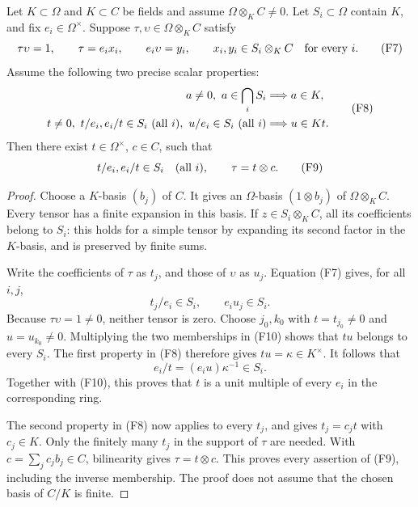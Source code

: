 \begin{srlemma}
\label{lem:faithful-flat-tensor-descent}
Let \(K\subset\Omega\) and \(K\subset C\) be fields and assume
\(\Omega\otimes_K C\ne0\).  Let \(S_i\subset\Omega\) contain \(K\),
and fix \(e_i\in\Omega^\times\).  Suppose
\(\tau,\upsilon\in\Omega\otimes_K C\) satisfy
\[
 \tau\upsilon=1,\qquad
 \tau=e_i x_i,\qquad e_i\upsilon=y_i,\qquad
 x_i,y_i\in S_i\otimes_K C \quad\hbox{for every }i.
 \tag{F7}\label{eq:faithful-descent-local-tensors}
\]
Assume the following two precise scalar properties:
\[
 \begin{split}
 a\ne0,\ a\in\bigcap_iS_i
     &\Longrightarrow a\in K,\\
 t\ne0,\ t/e_i,e_i/t\in S_i\ (\hbox{all }i),\
                 u/e_i\in S_i\ (\hbox{all }i)
     &\Longrightarrow u\in Kt .
 \end{split}                                      \tag{F8}
 \label{eq:faithful-descent-scalar-properties}
\]
Then there exist \(t\in\Omega^\times\), \(c\in C\), such that
\[
            t/e_i,e_i/t\in S_i\quad(\hbox{all }i),
                   \qquad \tau=t\otimes c.
 \tag{F9}\label{eq:faithful-descent-result}
\]
\end{srlemma}
\begin{proof}
Choose a \(K\)-basis \((b_j)\) of \(C\).
It gives an \(\Omega\)-basis \((1\otimes b_j)\) of
\(\Omega\otimes_K C\).  Every tensor has a finite expansion in
this basis.  If \(z\in S_i\otimes_K C\), all its coefficients
belong to \(S_i\): this holds for a simple tensor by expanding its
second factor in the \(K\)-basis, and is preserved by finite sums.

Write the coefficients of \(\tau\) as \(t_j\), and those of
\(\upsilon\) as \(u_j\).  Equation (F7) gives, for all \(i,j\),
\[
                         t_j/e_i\in S_i,\qquad
                         e_i u_j\in S_i .
 \tag{F10}\label{eq:faithful-descent-coefficients}
\]
Because \(\tau\upsilon=1\ne0\), neither tensor is zero.
Choose \(j_0,k_0\) with \(t=t_{j_0}\ne0\) and \(u=u_{k_0}\ne0\).
Multiplying the two memberships in (F10) shows that \(tu\)
belongs to every \(S_i\).  The first property in (F8) therefore
gives \(tu=\kappa\in K^\times\).
It follows that
\[
                   e_i/t=(e_i u)\kappa^{-1}\in S_i.
\]
Together with (F10), this proves that \(t\) is a unit multiple
of every \(e_i\) in the corresponding ring.

The second property in (F8) now applies to every \(t_j\),
and gives \(t_j=c_jt\) with \(c_j\in K\).
Only the finitely many \(t_j\) in the support of \(\tau\)
are needed.  With \(c=\sum_jc_jb_j\in C\), bilinearity gives
\(\tau=t\otimes c\).
This proves every assertion of (F9), including the inverse
membership.  The proof does not assume that the chosen basis
of \(C/K\) is finite.
\end{proof}

